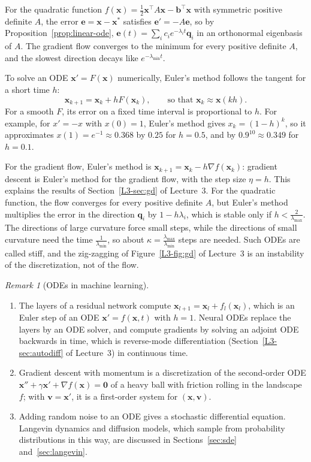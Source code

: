 \documentclass[11pt]{article}
\theoremstyle{definition}
\theoremstyle{plain}
\theoremstyle{remark}
\newtheorem{remark}[definition]{Remark}
\begin{document}
For the quadratic function $f(\mathbf{x}) = \frac{1}{2}\mathbf{x}^\top A\mathbf{x} - \mathbf{b}^\top\mathbf{x}$ with symmetric positive definite $A$, the error $\mathbf{e} = \mathbf{x} - \mathbf{x}^*$ satisfies $\mathbf{e}' = -A\mathbf{e}$, so by Proposition~\ref{prop:linear-ode}, $\mathbf{e}(t) = \sum_i c_ie^{-\lambda_i t}\mathbf{q}_i$ in an orthonormal eigenbasis of $A$. The gradient flow converges to the minimum for every positive definite $A$, and the slowest direction decays like $e^{-\lambda_{\min}t}$.

To solve an ODE $\mathbf{x}' = F(\mathbf{x})$ numerically, Euler's method follows the tangent for a short time $h$:
\[\mathbf{x}_{k+1} = \mathbf{x}_k + hF(\mathbf{x}_k), \qquad \text{so that } \mathbf{x}_k \approx \mathbf{x}(kh).\]
For a smooth $F$, its error on a fixed time interval is proportional to $h$. For example, for $x' = -x$ with $x(0) = 1$, Euler's method gives $x_k = (1 - h)^k$, so it approximates $x(1) = e^{-1} \approx 0.368$ by $0.25$ for $h = 0.5$, and by $0.9^{10} \approx 0.349$ for $h = 0.1$.

For the gradient flow, Euler's method is $\mathbf{x}_{k+1} = \mathbf{x}_k - h\nabla f(\mathbf{x}_k)$: gradient descent is Euler's method for the gradient flow, with the step size $\eta = h$. This explains the results of Section~\ref{L3-sec:gd} of Lecture~3. For the quadratic function, the flow converges for every positive definite $A$, but Euler's method multiplies the error in the direction $\mathbf{q}_i$ by $1 - h\lambda_i$, which is stable only if $h < \frac{2}{\lambda_{\max}}$. The directions of large curvature force small steps, while the directions of small curvature need the time $\frac{1}{\lambda_{\min}}$, so about $\kappa = \frac{\lambda_{\max}}{\lambda_{\min}}$ steps are needed. Such ODEs are called stiff, and the zig-zagging of Figure~\ref{L3-fig:gd} of Lecture~3 is an instability of the discretization, not of the flow.

\begin{remark}[ODEs in machine learning]
    \begin{enumerate}
        \item The layers of a residual network compute $\mathbf{x}_{l+1} = \mathbf{x}_l + f_l(\mathbf{x}_l)$, which is an Euler step of an ODE $\mathbf{x}' = f(\mathbf{x}, t)$ with $h = 1$. Neural ODEs replace the layers by an ODE solver, and compute gradients by solving an adjoint ODE backwards in time, which is reverse-mode differentiation (Section~\ref{L3-sec:autodiff} of Lecture~3) in continuous time.
        \item Gradient descent with momentum is a discretization of the second-order ODE $\mathbf{x}'' + \gamma\mathbf{x}' + \nabla f(\mathbf{x}) = \mathbf{0}$ of a heavy ball with friction rolling in the landscape $f$; with $\mathbf{v} = \mathbf{x}'$, it is a first-order system for $(\mathbf{x}, \mathbf{v})$.
        \item Adding random noise to an ODE gives a stochastic differential equation. Langevin dynamics and diffusion models, which sample from probability distributions in this way, are discussed in Sections~\ref{sec:sde} and~\ref{sec:langevin}.
    \end{enumerate}
\end{remark}
\end{document}
